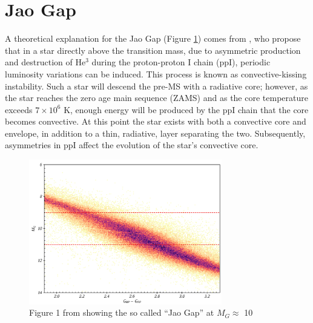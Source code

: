 \section{Jao Gap}\label{sec:JaoGap}
A theoretical explanation for the Jao Gap (Figure \ref{fig:JaoGap}) comes from
\citet{van2012}, who propose that in a star directly above the transition mass,
due to asymmetric production and destruction of He$^{3}$ during the
proton-proton I chain (ppI), periodic luminosity variations can be induced.
This process is known as convective-kissing instability. Such a star will
descend the pre-MS with a radiative core; however, as the star reaches the zero
age main sequence (ZAMS) and as the core temperature exceeds $7\times 10^{6}$
K, enough energy will be produced by the ppI chain that the core becomes
convective. At this point the star exists with both a convective core and
envelope, in addition to a thin, radiative, layer separating the two.
Subsequently, asymmetries in ppI affect the evolution of the star's convective
core.

\begin{figure}
	\centering
	\includegraphics[width=0.75\textwidth]{src/figures/JaoGap.png}
	\caption{Figure 1 from \citet{Jao2018} showing the so called ``Jao Gap'' at
	$M_{G}\approx$ 10}
	\label{fig:JaoGap}
\end{figure}

